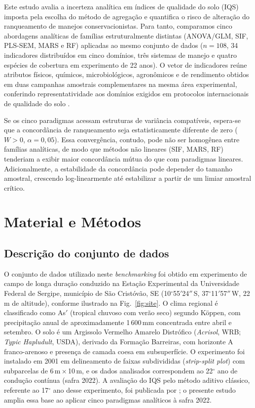 \documentclass[pdflatex,sn-basic]{sn-jnl}%
\begin{document}
Este estudo avalia a incerteza analítica em índices de qualidade do solo (IQS) imposta pela escolha do método de agregação e quantifica o risco de alteração do ranqueamento de manejos conservacionistas. Para tanto, comparamos cinco abordagens analíticas de famílias estruturalmente distintas (ANOVA/GLM, SIF, PLS-SEM, MARS e RF) aplicadas ao mesmo conjunto de dados ($n = 108$, 34 indicadores distribuídos em cinco domínios, três sistemas de manejo e quatro espécies de cobertura em experimento de 22 anos). O vetor de indicadores reúne atributos físicos, químicos, microbiológicos, agronômicos e de rendimento obtidos em duas campanhas amostrais complementares na mesma área experimental, conferindo representatividade aos domínios exigidos em protocolos internacionais de qualidade do solo \citep{Karlen1997,Andrews2002}.

Se os cinco paradigmas acessam estruturas de variância compatíveis, espera-se que a concordância de ranqueamento seja estatisticamente diferente de zero ($W > 0$, $\alpha = 0{,}05$). Essa convergência, contudo, pode não ser homogênea entre famílias analíticas, de modo que métodos não lineares (SIF, MARS, RF) tenderiam a exibir maior concordância mútua do que com paradigmas lineares. Adicionalmente, a estabilidade da concordância pode depender do tamanho amostral, crescendo log-linearmente até estabilizar a partir de um limiar amostral crítico.

\section{Material e Métodos}\label{sec:material}

\subsection{Descrição do conjunto de dados}\label{subsec:dataset}

O conjunto de dados utilizado neste \textit{benchmarking} foi obtido em experimento de campo de longa duração conduzido na Estação Experimental da Universidade Federal de Sergipe, município de São Cristóvão, SE (10$^\circ$55$'$24$''$\,S, 37$^\circ$11$'$57$''$\,W, 22\,m de altitude), conforme ilustrado na Fig.~\ref{fig:site}. O clima regional é classificado como As$'$ (tropical chuvoso com verão seco) segundo Köppen, com precipitação anual de aproximadamente 1\,600\,mm concentrada entre abril e setembro. O solo é um Argissolo Vermelho Amarelo Distrófico (\textit{Acrisol}, WRB; \textit{Typic Hapludult}, USDA), derivado da Formação Barreiras, com horizonte A franco-arenoso e presença de camada coesa em subsuperfície. O experimento foi instalado em 2001 em delineamento de faixas subdivididas (\textit{strip-split plot}) com subparcelas de 6\,m\,$\times$\,10\,m, e os dados analisados correspondem ao 22$^\circ$ ano de condução contínua (safra 2022). A avaliação do IQS pelo método aditivo clássico, referente ao 17$^\circ$ ano desse experimento, foi publicada por \cite{Assuncao2023}; o presente estudo amplia essa base ao aplicar cinco paradigmas analíticos à safra 2022.
\end{document}
